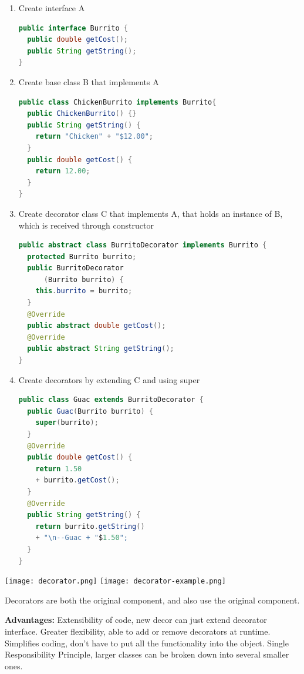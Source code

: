 \documentclass[letterpaper, 8pt]{extarticle}
\begin{document}
\begin{multicols*}{6}
    \begin{enumerate}
        \item Create interface A
        \begin{lstlisting}[language=Java, breaklines=true]
public interface Burrito {
  public double getCost();
  public String getString();
}
        \end{lstlisting}
        \item Create base class B that implements A
        \begin{lstlisting}[language=Java, breaklines=true]
public class ChickenBurrito implements Burrito{
  public ChickenBurrito() {}
  public String getString() {
	return "Chicken" + "$12.00";
  }
  public double getCost() {
    return 12.00;
  }
}
        \end{lstlisting}
        \item Create decorator class C that implements A, 
        that holds an instance of B, 
        which is received through constructor
        \begin{lstlisting}[language=Java, breaklines=true]
public abstract class BurritoDecorator implements Burrito {
  protected Burrito burrito;
  public BurritoDecorator
      (Burrito burrito) {
    this.burrito = burrito;
  }
  @Override
  public abstract double getCost();
  @Override
  public abstract String getString();
}
        \end{lstlisting}
        \item Create decorators by extending C and using super
        \begin{lstlisting}[language=Java, breaklines=true]
public class Guac extends BurritoDecorator {
  public Guac(Burrito burrito) {
	super(burrito);
  }
  @Override
  public double getCost() {
	return 1.50
    + burrito.getCost();
  }
  @Override
  public String getString() {
	return burrito.getString() 
    + "\n--Guac + "$1.50";
  }
}\end{lstlisting}
    \end{enumerate}

    \begin{center}
        \texttt{[image: decorator.png]}
        \texttt{[image: decorator-example.png]}
    \end{center}

    Decorators are both the original component, and also use the original component.

    \textbf{Advantages:}
    Extensibility of code, new decor can just extend decorator interface.
    Greater flexibility, able to add or remove decorators at runtime.
    Simplifies coding, don't have to put all the functionality into the object.
    Single Responsibility Principle, larger classes can be broken down into several smaller ones.


\end{multicols*}
\end{document}
